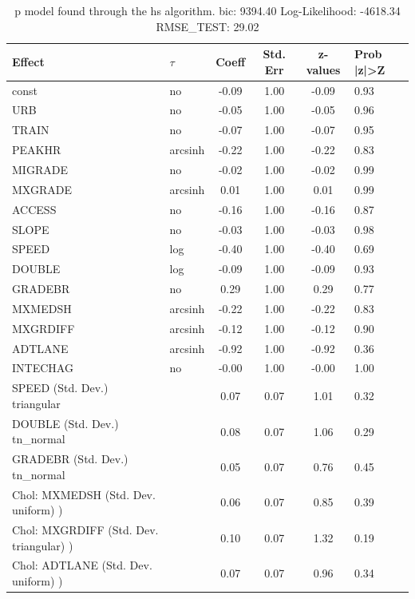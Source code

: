 \begin{table}
	\caption{p model found through the hs algorithm. bic: 9394.40 Log-Likelihood: -4618.34 RMSE_TEST: 29.02}
	\begin{center}
		\begin{tabular}{|l|l|c|c|c|l|}
			\hline
			Effect & $\tau$ & Coeff & Std. Err & z-values & Prob |z|>Z \\
			\hline
			const & no & -0.09 & 1.00 & -0.09 & 0.93 \\
			\hline
			URB & no & -0.05 & 1.00 & -0.05 & 0.96 \\
			\hline
			TRAIN & no & -0.07 & 1.00 & -0.07 & 0.95 \\
			\hline
			PEAKHR & arcsinh & -0.22 & 1.00 & -0.22 & 0.83 \\
			\hline
			MIGRADE & no & -0.02 & 1.00 & -0.02 & 0.99 \\
			\hline
			MXGRADE & arcsinh & 0.01 & 1.00 & 0.01 & 0.99 \\
			\hline
			ACCESS & no & -0.16 & 1.00 & -0.16 & 0.87 \\
			\hline
			SLOPE & no & -0.03 & 1.00 & -0.03 & 0.98 \\
			\hline
			SPEED & log & -0.40 & 1.00 & -0.40 & 0.69 \\
			\hline
			DOUBLE & log & -0.09 & 1.00 & -0.09 & 0.93 \\
			\hline
			GRADEBR & no & 0.29 & 1.00 & 0.29 & 0.77 \\
			\hline
			MXMEDSH & arcsinh & -0.22 & 1.00 & -0.22 & 0.83 \\
			\hline
			MXGRDIFF & arcsinh & -0.12 & 1.00 & -0.12 & 0.90 \\
			\hline
			ADTLANE & arcsinh & -0.92 & 1.00 & -0.92 & 0.36 \\
			\hline
			INTECHAG & no & -0.00 & 1.00 & -0.00 & 1.00 \\
			\hline
			SPEED (Std. Dev.) triangular &  & 0.07 & 0.07 & 1.01 & 0.32 \\
			\hline
			DOUBLE (Std. Dev.) tn_normal &  & 0.08 & 0.07 & 1.06 & 0.29 \\
			\hline
			GRADEBR (Std. Dev.) tn_normal &  & 0.05 & 0.07 & 0.76 & 0.45 \\
			\hline
			 Chol: MXMEDSH (Std. Dev. uniform) ) &  & 0.06 & 0.07 & 0.85 & 0.39 \\
			\hline
			 Chol: MXGRDIFF (Std. Dev. triangular) ) &  & 0.10 & 0.07 & 1.32 & 0.19 \\
			\hline
			 Chol: ADTLANE (Std. Dev. uniform) ) &  & 0.07 & 0.07 & 0.96 & 0.34 \\

\end{tabular}
\end{center}
\end{table}
